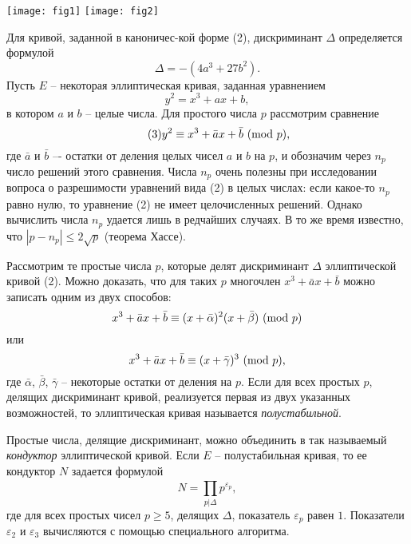 \begin{multicols}{3}
\begin{Figure}
 \centering
 \texttt{[image: fig1]}
 \hspace{\columnwidth}
 \texttt{[image: fig2]}
\end{Figure}
\noindent
Для кривой, заданной в каноничес-кой форме (2), дискриминант $\Delta$ определяется формулой
\begin{equation*}
    \Delta = -(4a^3 + 27b^2).
\end{equation*}
Пусть $E$  -- некоторая эллиптическая кривая, заданная уравнением
\begin{equation*}
    y^2 = x^3 + ax + b,
\end{equation*}
в котором $a$ и $b$ -- целые числа. Для простого числа $p$ рассмотрим сравнение
\begin{equation}
    \tag{3}
    \label{eq:comp}
    y^2 \equiv x^3 + \bar{a}x + \bar{b}\ (\mathrm{mod}\ p), 
\end{equation}
где $\bar{a}$ и $\bar{b}$ –- остатки от деления целых чисел $a$ и $b$ на $p$, и обозначим через $n_p$ число решений этого сравнения. Числа $n_p$ очень полезны при исследовании вопроса о разрешимости уравнений вида (2) в целых числах: если какое-то $n_p$ равно нулю, то уравнение (2) не имеет целочисленных решений. Однако вычислить числа $n_p$ удается лишь в редчайших случаях.
В то же время известно, что $|p - n_p| \leq 2 \sqrt{p}$ (теорема Хассе).

Рассмотрим те простые числа  $p$, которые делят дискриминант $\Delta $ эллиптической кривой (2). Можно доказать, что для таких $p$ многочлен $x^3 +\bar{a}x + \bar{b}$ можно записать одним из двух способов:
\begin{equation*}
    x^3 + \bar{a}x + \bar{b} \equiv (x + \bar{\alpha})^2(x + \bar{\beta})\ (\mathrm{mod}\ p)
\end{equation*}
или
\begin{equation*}
    x^3 + \bar{a}x + \bar{b} \equiv (x + \bar{\gamma})^3\ (\mathrm{mod}\ p),
\end{equation*}
где $\bar{\alpha}$, $\bar{\beta}$, $\bar{\gamma}$ -- некоторые остатки от деления на $p$. Если для всех простых $p$, делящих дискриминант кривой, реализуется первая из двух указанных возможностей, то эллиптическая кривая называется \emph{полустабильной}.

Простые числа, делящие дискриминант, можно объединить в так называемый \emph{кондуктор} эллиптической кривой. Если $E$ -- полустабильная кривая, то ее кондуктор $N$ задается формулой
\begin{equation}
    \tag{4}
    N = \prod_{p|\Delta}^{} p^{\varepsilon_p},
\end{equation}
где для всех простых чисел $p \geq 5$, делящих $\Delta$, показатель $\varepsilon_p$ равен $1$. Показатели $\varepsilon_2$ и $\varepsilon_3$ вычисляются с помощью специального алгоритма.

\end{multicols}
